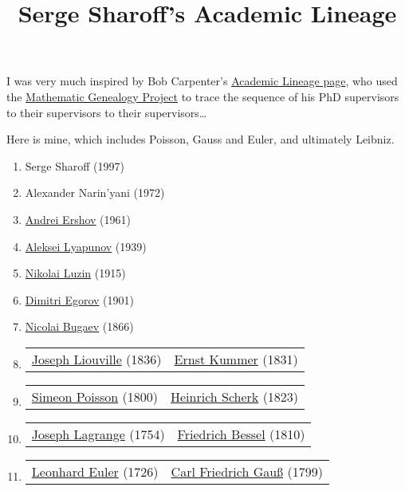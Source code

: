 \documentclass[12pt]{article}
\title{Serge Sharoff's Academic Lineage}
\date{}
\begin{document}
I was very much inspired by Bob Carpenter's \href{https://bob-carpenter.github.io/Personal/academic-lineage.html}{Academic Lineage page}, who used the \href{https://www.genealogy.math.ndsu.nodak.edu/}{Mathematic Genealogy Project} to trace the sequence of his PhD supervisors to their supervisors to their supervisors\ldots

Here is mine, which includes Poisson, Gauss and Euler, and ultimately Leibniz.

\begin{enumerate}
\item Serge Sharoff (1997)
\item Alexander Narin'yani (1972)
\item \href{https://www.genealogy.math.ndsu.nodak.edu/id.php?id=56748}{Andrei Ershov} (1961)
\item \href{https://www.genealogy.math.ndsu.nodak.edu/id.php?id=55572}{Aleksei Lyapunov} (1939)
\item \href{https://www.genealogy.math.ndsu.nodak.edu/id.php?id=10479}{Nikolai Luzin} (1915)
\item \href{https://www.genealogy.math.ndsu.nodak.edu/id.php?id=24109}{Dimitri Egorov} (1901)
\item \href{https://www.genealogy.math.ndsu.nodak.edu/id.php?id=24101}{Nicolai Bugaev} (1866)
\item \begin{tabular}{p{30ex}p{30ex}}
  \href{https://www.genealogy.math.ndsu.nodak.edu/id.php?id=55185}{Joseph Liouville} (1836) & \href{https://www.genealogy.math.ndsu.nodak.edu/id.php?id=18331}{Ernst Kummer} (1831)  \end{tabular}
\item \begin{tabular}{p{30ex}p{30ex}} \href{https://www.genealogy.math.ndsu.nodak.edu/id.php?id=17865}{Simeon Poisson} (1800) & \href{https://www.genealogy.math.ndsu.nodak.edu/id.php?id=25484}{Heinrich Scherk} (1823) \end{tabular}
\item \begin{tabular}{p{30ex}p{30ex}} \href{https://www.genealogy.math.ndsu.nodak.edu/id.php?id=17864}{Joseph Lagrange} (1754) & \href{https://www.genealogy.math.ndsu.nodak.edu/id.php?id=18603}{Friedrich Bessel} (1810) \end{tabular}
\item \begin{tabular}{p{30ex}p{30ex}} \href{https://www.genealogy.math.ndsu.nodak.edu/id.php?id=38586}{Leonhard Euler} (1726) & \href{https://www.genealogy.math.ndsu.nodak.edu/id.php?id=18231}{Carl Friedrich Gauß} (1799) \end{tabular}

\end{enumerate}
\end{document}
